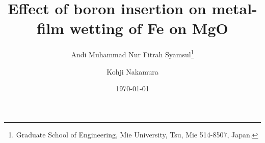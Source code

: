 \documentclass[10pt]{article}
\title{Effect of boron insertion on metal-film wetting of Fe on MgO}
\author{Andi Muhammad Nur Fitrah Syamsul\thanks{Graduate School of Engineering, Mie University,
Tsu, Mie 514-8507, Japan.}\and Kohji Nakamura}
\date{\today}
\begin{document}
\maketitle

\begin{abstract}

\end{abstract}









\end{document}
